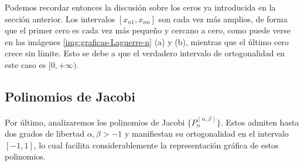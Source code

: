 Podemos recordar entonces la discusión sobre los ceros ya introducida en la sección anterior. Los intervalos $[x_{n1}, x_{nn}]$ son cada vez más amplios, de forma que el primer cero es cada vez más pequeño y cercano a cero, como puede verse en las imágenes \ref{img:graficas-Laguerre-n} (a) y (b), mientras que el último cero crece sin límite. Esto se debe a que el verdadero intervalo de ortogonalidad en este caso es $[0,+\infty)$.

\subsection{Polinomios de Jacobi}

Por último, analizaremos los polinomios de Jacobi $\{P_n^{(\alpha,\beta)}\}$. Estos admiten hasta dos grados de libertad $\alpha,\beta > -1$ y manifiestan su ortogonalidad en el intervalo $[-1,1]$, lo cual facilita considerablemente la representación gráfica de estos polinomios. 

